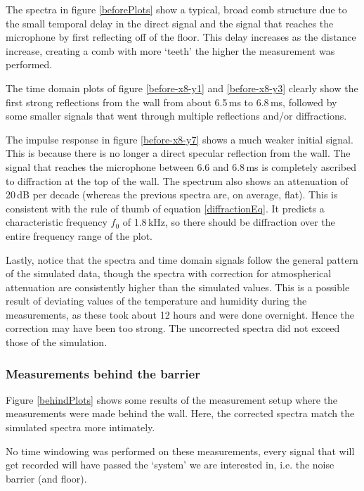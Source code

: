 The spectra in figure \ref{beforePlots} show a typical, broad comb structure due to the small temporal delay in the direct signal and the signal that reaches the microphone by first reflecting off of the floor. This delay increases as the distance increase, creating a comb with more `teeth' the higher the measurement was performed.

The time domain plots of figure \ref{before-x8-y1} and \ref{before-x8-y3} clearly show the first strong reflections from the wall from about 6.5\,ms to 6.8\,ms, followed by some smaller signals that went through multiple reflections and/or diffractions.

The impulse response in figure \ref{before-x8-y7} shows a much weaker initial signal. This is because there is no longer a direct specular reflection from the wall. The signal that reaches the microphone between 6.6 and 6.8\,ms is completely ascribed to diffraction at the top of the wall. The spectrum also shows an attenuation of 20\,dB per decade (whereas the previous spectra are, on average, flat). This is consistent with the rule of thumb of equation \ref{diffractionEq}. It predicts a characteristic frequency $f_0$ of 1.8\,kHz, so there should be diffraction over the entire frequency range of the plot.

Lastly, notice that the spectra and time domain signals follow the general pattern of the simulated data, though the spectra with correction for atmospherical attenuation are consistently higher than the simulated values. This is a possible result of deviating values of the temperature and humidity during the measurements, as these took about 12 hours and were done overnight. Hence the correction may have been too strong. The uncorrected spectra did not exceed those of the simulation.



\subsubsection*{Measurements behind the barrier}

Figure \ref{behindPlots} shows some results of the measurement setup where the measurements were made behind the wall. Here, the corrected spectra match the simulated spectra more intimately.

No time windowing was performed on these measurements, every signal that will get recorded will have passed the `system' we are interested in, i.e. the noise barrier (and floor). 

